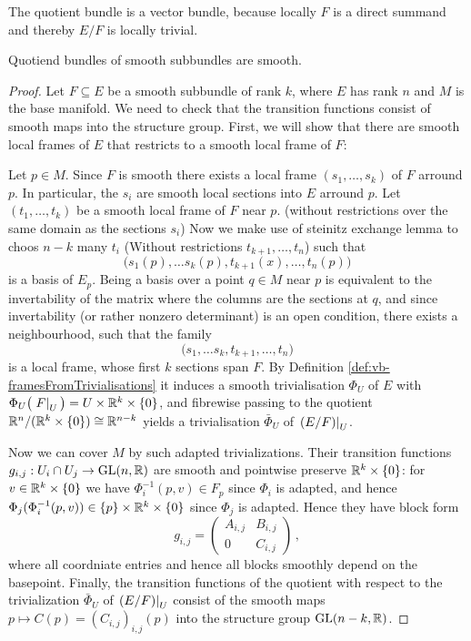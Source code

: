 \begin{corollary}
	The quotient bundle is a vector bundle, because locally $F$ is a direct summand and thereby $E\slash F$ is locally trivial.
\end{corollary}
\begin{lemma}\label{lem:vb-quotiendBundlesOfSmoothSubbundlesAreSmooth}
	Quotiend bundles of smooth subbundles are smooth.
\end{lemma}
\begin{proof}
Let $F \subseteq E$ be a smooth subbundle of rank $k$, where $E$ has rank $n$ and $M$ is the base manifold. We need to check that the transition functions consist of smooth maps into the structure group. First, we will show that there are smooth local frames of $E$ that restricts to a smooth local frame of $F$:

Let $p\in M$. Since $F$ is smooth there exists a local frame $(s_1,\dots ,s_k)$ of $F$ arround $p$. In particular, the $s_i$ are smooth local sections into $E$ arround $p$. Let $(t_1,\dots, t_k)$ be a smooth local frame of $F$ near $p$. (without restrictions over the same domain as the sections $s_i$) Now we make use of steinitz exchange lemma to choos $n-k$ many $t_i$ (Without restrictions $t_{k+1},\dots,t_n$) such that 
\begin{equation*}
	\big(s_1(p),\dots s_k(p),t_{k+1}(x),\dots,t_n(p))
\end{equation*} is a basis of $E_p$. Being a basis over a point $q\in M$ near $p$ is equivalent to the invertability of the matrix where the columns are the sections at $q$, and since invertability (or rather nonzero determinant) is an open condition, there exists a neighbourhood, such that the family 
\begin{equation*}
	\big(s_1,\dots s_k,t_{k+1},\dots,t_n)
\end{equation*} is a local frame, whose first $k$ sections span $F$.  By Definition
    \ref{def:vb-framesFromTrivialisations} it induces a smooth
    trivialisation $\Phi_U$ of $E$ with
    $\Phi_U\big(\left.F\right|_{U}\big)=U\times\mathbb{R}^k\times\{0\}$, and
    fibrewise passing to the quotient
    $\mathbb{R}^n/(\mathbb{R}^k\times\{0\})\cong\mathbb{R}^{n-k}$ yields a trivialisation
    $\bar\Phi_U$ of $\left.(E/F)\right|_{U}$.

	Now we can cover $M$ by such adapted trivializations. Their transition functions  $g_{i,j}:U_i\cap U_j\to\mathrm{GL}(n,\mathbb{R})$ are smooth and pointwise preserve $\mathbb{R}^k\times\{0\}$: for $v\in\mathbb{R}^k\times\{0\}$ we have
$\Phi_i^{-1}(p,v)\in F_p$ since $\Phi_i$ is adapted, and hence
$\Phi_j(\Phi_i^{-1}(p,v))\in\{p\}\times\mathbb{R}^k\times\{0\}$ since $\Phi_j$
is adapted. Hence they have block form
\begin{equation*}
	g_{i,j}=\begin{pmatrix} A_{i,j} & B_{i,j}\\ 0 & C_{i,j}\end{pmatrix}\,,
\end{equation*}where all coordniate entries and hence all blocks smoothly depend on the basepoint. Finally, the transition functions of the quotient with respect to the trivialization $\bar\Phi_U$ of $\left.(E/F)\right|_{U}$ consist of the smooth maps $p\mapsto C(p)=(C_{i,j})_{i,j}(p)$ into the structure group $\mathrm{GL}(n-k,\mathbb{R})$.
\end{proof}

